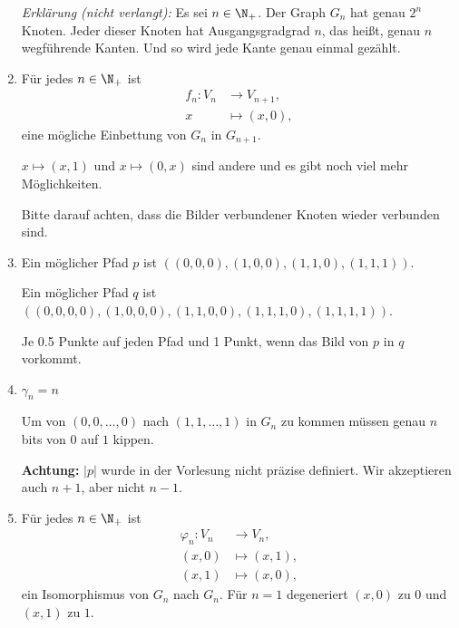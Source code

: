 \documentclass[12pt]{article}
\begin{document}
\begin{loesung}
\begin{enumerate}
      \emph{Erklärung (nicht verlangt):} Es sei $n \in \N_+$. Der Graph $G_n$ hat genau $2^n$ Knoten. Jeder dieser Knoten hat Ausgangsgradgrad $n$, das heißt, genau $n$ wegführende Kanten. Und so wird jede Kante genau einmal gezählt.
    \item Für jedes $n \in \N_+$ ist
          \begin{align*}
            f_n \colon V_n &\to     V_{n + 1},\\
                         x &\mapsto (x, 0),
          \end{align*}
          eine mögliche Einbettung von $G_n$ in $G_{n + 1}$.

          $x\mapsto (x,1)$ und $x\mapsto (0,x)$ sind andere und es gibt noch viel mehr Möglichkeiten.
          \begin{korrektur}
            Bitte darauf achten, dass die Bilder verbundener Knoten wieder verbunden sind.
          \end{korrektur}
    \item Ein möglicher Pfad $p$ ist $((0,0,0), (1,0,0), (1,1,0), (1,1,1))$. 

      Ein möglicher Pfad $q$ ist
      $((0,0,0,0), (1,0,0,0), (1,1,0,0), (1,1,1,0), (1,1,1,1))$.

      \begin{korrektur}
        Je 0.5 Punkte auf jeden Pfad und 1 Punkt, wenn das Bild von
        $p$ in $q$ vorkommt.
      \end{korrektur}
    \item $\gamma_n = n$

          Um von $(0,0,\dotsc,0)$ nach $(1,1,\dotsc,1)$ in $G_n$ zu kommen müssen genau $n$ bits von $0$ auf $1$ kippen.
          \begin{korrektur}
            \textbf{Achtung:} $|p|$ wurde in der Vorlesung nicht
            präzise definiert. Wir akzeptieren auch $n+1$, aber nicht $n-1$.
          \end{korrektur}
    \item Für jedes $n \in \N_+$ ist \zB
          \begin{align*}
            \varphi_n \colon V_n &\to     V_n,\\
                          (x, 0) &\mapsto (x, 1),\\
                          (x, 1) &\mapsto (x, 0),
          \end{align*}
          ein Isomorphismus von $G_n$ nach $G_n$. Für $n = 1$ degeneriert $(x, 0)$ zu $0$ und $(x, 1)$ zu $1$.


\end{enumerate}
\end{loesung}
\end{document}
